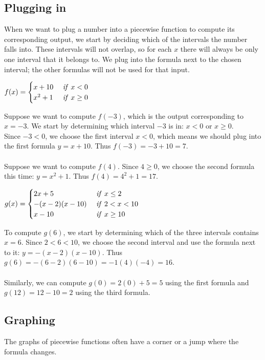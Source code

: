 \documentclass{ximera}
\begin{document}
\subsection{Plugging in}
When we want to plug a number into a piecewise function to compute its corresponding output, we start by deciding which of the intervals the number falls into. These intervals will not overlap, so for each $x$ there will always be only one interval that it belongs to. We plug into the formula next to the chosen interval; the other formulas will not be used for that input.

\begin{example}
$f(x)=\begin{cases} x+10 & \mbox{ \emph{if} }x<0\\x^2+1 & \mbox{ \emph{if} } x\geq 0\end{cases}$

Suppose we want to compute $f(-3)$, which is the output corresponding to $x=-3$. We start by determining which interval $-3$ is in: $x<0$ or $x\geq 0$. \\Since $-3<0$, we choose the first interval $x<0$, which means we should plug into the first formula $y=x+10$. Thus $f(-3)=-3+10=7$.
\\
\\Suppose we want to compute $f(4)$. Since $4\geq 0$, we choose the second formula this time: $y=x^2+1$. Thus $f(4)=4^2+1=17$.
\end{example}

\begin{example}
$g(x)=\begin{cases} 2x+5 & \mbox{ \emph{if} }x\leq 2\\ -(x-2)(x-10) & \mbox{ \emph{if} } 2<x<10\\ x-10 & \mbox{ \emph{if} } x\geq 10\end{cases}$

To compute $g(6)$, we start by determining which of the three intervals contains $x=6$. Since $2<6<10$, we choose the second interval and use the formula next to it: $y=-(x-2)(x-10)$. Thus $g(6)=-(6-2)(6-10)=-1(4)(-4)=16$.\\
\\Similarly, we can compute $g(0)=2(0)+5=5$ using the first formula and $g(12)=12-10=2$ using the third formula.
\end{example}



\subsection{Graphing}
The graphs of piecewise functions often have a corner or a jump where the formula changes. 
\end{document}
